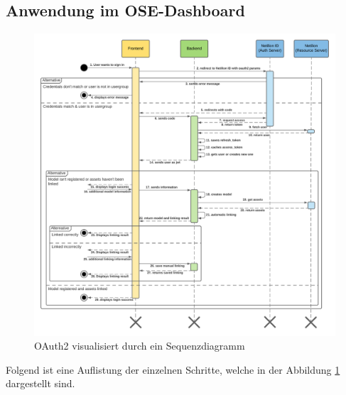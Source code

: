 \subsection{Anwendung im OSE-Dashboard}
\begin{figure}[!ht]
  \centering
  \includegraphics[width=1\linewidth]{./images/OAuth2.png}
  \caption[OAuth2 visualisiert durch ein Sequenzdiagramm]{OAuth2 visualisiert durch ein Sequenzdiagramm}
  \label{fig:oauth2}
\end{figure}
Folgend ist eine Auflistung der einzelnen Schritte, welche in der Abbildung \ref{fig:oauth2} dargestellt sind.
